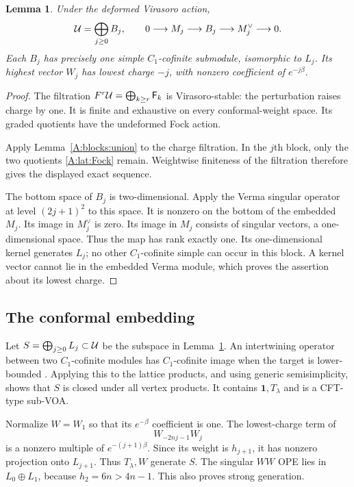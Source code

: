 \documentclass[11pt]{article}
\newtheorem{lemma}[theorem]{Lemma}
\newcommand{\one}{\mathbf1}\newcommand{\D}{\mathcal D}\newcommand{\Dcat}{\mathcal D}
\numberwithin{equation}{section}
\begin{document}
\begin{lemma}\label{A:lat:blocklemma}
Under the deformed Virasoro action,
\[
 \mathcal U=\bigoplus_{j\geq0}B_j,\qquad
 0\longrightarrow M_j\longrightarrow B_j\longrightarrow M_j^\vee\longrightarrow0.
\]
Each $B_j$ has precisely one simple $C_1$-cofinite submodule, isomorphic to $L_j$. Its highest vector $W_j$ has lowest charge $-j$, with nonzero coefficient of $e^{-j\beta}$.
\end{lemma}
\begin{proof}
The filtration $F^r\mathcal U=\bigoplus_{k\geq r}\mathsf F_k$ is Virasoro-stable: the perturbation raises charge by one. It is finite and exhaustive on every conformal-weight space. Its graded quotients have the undeformed Fock action.

Apply Lemma~\ref{A:blocks:union} to the charge filtration. In the $j$th block, only the two quotients \eqref{A:lat:Fock} remain. Weightwise finiteness of the filtration therefore gives the displayed exact sequence.

The bottom space of $B_j$ is two-dimensional. Apply the Verma singular operator at level $(2j+1)^2$ to this space. It is nonzero on the bottom of the embedded $M_j$. Its image in $M_j^\vee$ is zero. Its image in $M_j$ consists of singular vectors, a one-dimensional space. Thus the map has rank exactly one. Its one-dimensional kernel generates $L_j$; no other $C_1$-cofinite simple can occur in this block. A kernel vector cannot lie in the embedded Verma module, which proves the assertion about its lowest charge.
\end{proof}

\subsection{The conformal embedding}
Let $S=\bigoplus_{j\geq0}L_j\subset\mathcal U$ be the subspace in Lemma~\ref{A:lat:blocklemma}. An intertwining operator between two $C_1$-cofinite modules has $C_1$-cofinite image when the target is lower-bounded \cite[Theorem 4.1.7]{A:CJORY}. Applying this to the lattice products, and using generic semisimplicity, shows that $S$ is closed under all vertex products. It contains $\one,T_\lambda$ and is a CFT-type sub-VOA.

Normalize $W=W_1$ so that its $e^{-\beta}$ coefficient is one. The lowest-charge term of
\[
 W_{-2nj-1}W_j
\]
is a nonzero multiple of $e^{-(j+1)\beta}$. Since its weight is $h_{j+1}$, it has nonzero projection onto $L_{j+1}$. Thus $T_\lambda,W$ generate $S$. The singular $WW$ OPE lies in $L_0\oplus L_1$, because $h_2=6n>4n-1$. This also proves strong generation.
\end{document}
